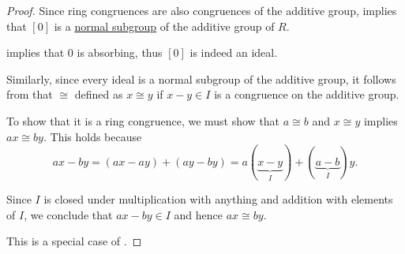 \begin{proof}
   Since ring congruences are also congruences of the additive group,  implies that \( [0] \) is a \hyperref[def:normal_subgroup]{normal subgroup} of the additive group of \( R \).

   implies that \( 0 \) is absorbing, thus \( [0] \) is indeed an ideal.

   Similarly, since every ideal is a normal subgroup of the additive group, it follows from  that \( {\cong} \) defined as \( x \cong y \) if \( x - y \in I \) is a congruence on the additive group.

  To show that it is a ring congruence, we must show that \( a \cong b \) and \( x \cong y \) implies \( ax \cong by \). This holds because
  \begin{equation*}
    ax - by
    =
    (ax - ay) + (ay - by)
    =
    a(\underbrace{x - y}_{I}) + (\underbrace{a - b}_{I})y.
  \end{equation*}

  Since \( I \) is closed under multiplication with anything and addition with elements of \( I \), we conclude that \( ax - by \in I \) and hence \( ax \cong by \).

   This is a special case of .
\end{proof}

